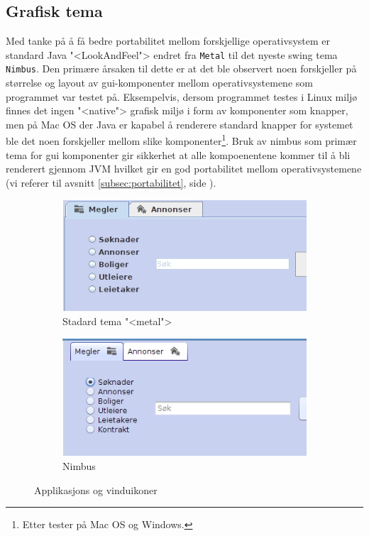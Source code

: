 \subsection{Grafisk tema}
Med tanke på å få bedre portabilitet mellom forskjellige operativsystem er standard Java "<LookAndFeel"> endret fra \texttt{Metal} til det nyeste swing tema \texttt{Nimbus}. Den primære årsaken til dette er at det ble observert noen forskjeller på størrelse og layout av gui-komponenter mellom operativsystemene som programmet var testet på. Eksempelvis, dersom programmet testes i Linux miljø finnes det ingen "<native"> grafisk miljø i form av komponenter som knapper, men på Mac OS der Java er kapabel å renderere standard knapper for systemet ble det noen forskjeller mellom slike komponenter\footnote{Etter tester på Mac OS og Windows.}. Bruk av nimbus som primær tema for gui komponenter gir sikkerhet at alle kompoenentene kommer til å bli renderert gjennom JVM hvilket gir en god portabilitet mellom operativsystemene (vi referer til avsnitt \ref{subsec:portabilitet}, side \pageref{subsec:portabilitet}).

\begin{figure}[ht!]
\centering
\begin{subfigure}[b]{0.3\textwidth}
\centering
\includegraphics[trim=0cm 0cm 7cm 0cm, clip,scale=0.5]{./img/produktdokumentasjon/visuelle_detaljer/metal.png}
\caption{Stadard tema "<metal">}
\end{subfigure}
\begin{subfigure}[b]{0.3\textwidth}
\centering
\includegraphics[trim=0cm 0cm 7cm 0.2cm, clip,scale=0.5]{./img/produktdokumentasjon/visuelle_detaljer/nimbus.png}
\caption{Nimbus}
\end{subfigure}
\caption{Applikasjons og vinduikoner}\label{fig:tema}
\end{figure}